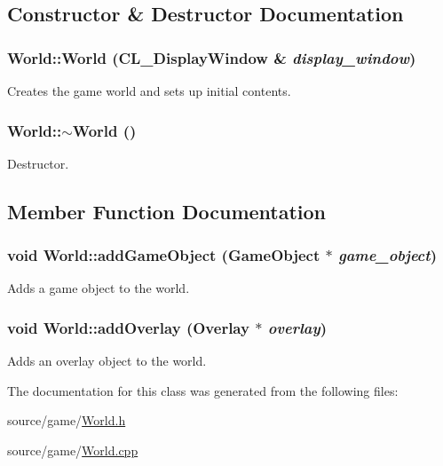 \subsection{Constructor \& Destructor Documentation}
\hypertarget{classWorld_a6ce0c6ba5ce813c0ec0b910a88e09d64}{
\subsubsection[{World}]{\setlength{\rightskip}{0pt plus 5cm}World::World (CL\_\-DisplayWindow \& {\em display\_\-window})}}
\label{classWorld_a6ce0c6ba5ce813c0ec0b910a88e09d64}
Creates the game world and sets up initial contents. \hypertarget{classWorld_a8c73fba541a5817fff65147ba47cd827}{
\subsubsection[{$\sim$World}]{\setlength{\rightskip}{0pt plus 5cm}World::$\sim$World ()}}
\label{classWorld_a8c73fba541a5817fff65147ba47cd827}
Destructor. 

\subsection{Member Function Documentation}
\hypertarget{classWorld_ad74a2b078f0173249b04e3da2982d081}{
\subsubsection[{addGameObject}]{\setlength{\rightskip}{0pt plus 5cm}void World::addGameObject ({\bf GameObject} $\ast$ {\em game\_\-object})}}
\label{classWorld_ad74a2b078f0173249b04e3da2982d081}
Adds a game object to the world. \hypertarget{classWorld_a6703e4f889e72198e0ede0cd23864792}{
\subsubsection[{addOverlay}]{\setlength{\rightskip}{0pt plus 5cm}void World::addOverlay ({\bf Overlay} $\ast$ {\em overlay})}}
\label{classWorld_a6703e4f889e72198e0ede0cd23864792}
Adds an overlay object to the world. 

The documentation for this class was generated from the following files:\begin{DoxyCompactItemize}
\item 
source/game/\hyperlink{World_8h}{World.h}\item 
source/game/\hyperlink{World_8cpp}{World.cpp}\end{DoxyCompactItemize}
